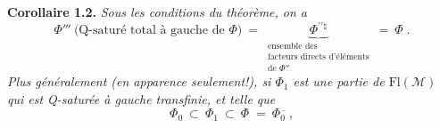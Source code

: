 \documentclass[11pt]{article}
\newcommand{\tld}{\tilde{}}   %
\begin{document}
\bigskip

\textbf{Corollaire 1.2.} \textit{Sous les conditions du théorème, on a}
\[
\Phi''' \ \text{(Q-saturé total à gauche de $\Phi$)} \ = \
\underbrace{\Phi^{\prime\prime\natural}}_{\substack{\text{ensemble des}\\ \text{facteurs directs d'éléments}\\ \text{de $\Phi''$}}}
\ = \ \Phi^{\tld}\ .
\tag*{(1.2.1)}
\]
\textit{Plus généralement (en apparence seulement!), si $\Phi_1$ est une partie de \textup{$\mathrm{Fl}(\mathcal{M})$} qui est \textup{Q}-saturée à gauche transfinie, et telle que}
\[
\Phi_0 \ \subset \ \Phi_1 \ \subset \ \Phi^{\tld} \ = \ \Phi_0{}^{\tld}\ ,
\]
\end{document}
